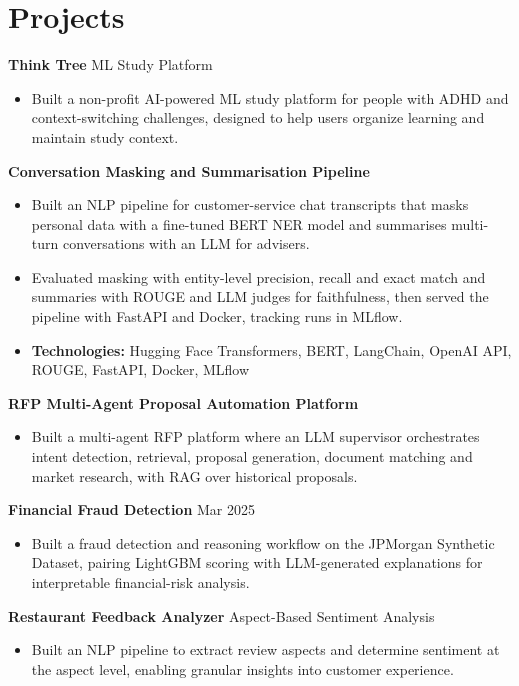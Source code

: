\documentclass[10pt,a4paper]{article}
\begin{document}
\section{Projects}
\textbf{Think Tree} \textbar{} ML Study Platform\par
\begin{itemize}
  \item Built a non-profit AI-powered ML study platform for people with ADHD and context-switching challenges, designed to help users organize learning and maintain study context.
\end{itemize}
\textbf{Conversation Masking and Summarisation Pipeline}\par
\begin{itemize}
  \item Built an NLP pipeline for customer-service chat transcripts that masks personal data with a fine-tuned BERT NER model and summarises multi-turn conversations with an LLM for advisers.
  \item Evaluated masking with entity-level precision, recall and exact match and summaries with ROUGE and LLM judges for faithfulness, then served the pipeline with FastAPI and Docker, tracking runs in MLflow.
  \item \textbf{Technologies:} Hugging Face Transformers, BERT, LangChain, OpenAI API, ROUGE, FastAPI, Docker, MLflow
\end{itemize}
\textbf{RFP Multi-Agent Proposal Automation Platform}\par
\begin{itemize}
  \item Built a multi-agent RFP platform where an LLM supervisor orchestrates intent detection, retrieval, proposal generation, document matching and market research, with RAG over historical proposals.
\end{itemize}
\textbf{Financial Fraud Detection} \textbar{} Mar 2025\par
\begin{itemize}
  \item Built a fraud detection and reasoning workflow on the JPMorgan Synthetic Dataset, pairing LightGBM scoring with LLM-generated explanations for interpretable financial-risk analysis.
\end{itemize}
\textbf{Restaurant Feedback Analyzer} \textbar{} Aspect-Based Sentiment Analysis\par
\begin{itemize}
  \item Built an NLP pipeline to extract review aspects and determine sentiment at the aspect level, enabling granular insights into customer experience.
\end{itemize}
\end{document}
